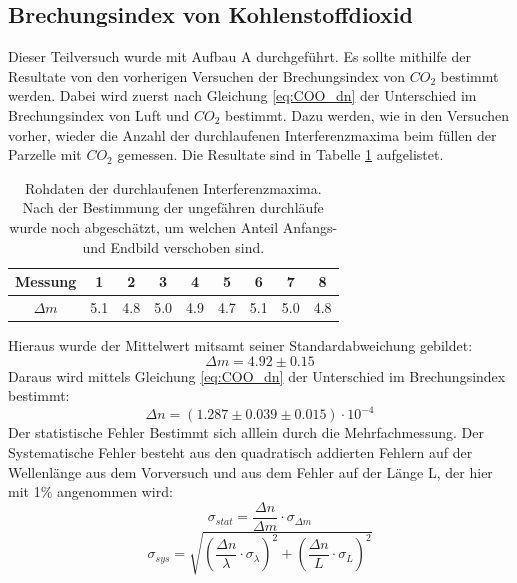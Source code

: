 \documentclass[12pt,a4paper]{article}
\begin{document}
\subsection{Brechungsindex von Kohlenstoffdioxid}
Dieser Teilversuch wurde mit Aufbau A durchgeführt.
Es sollte mithilfe der Resultate von den vorherigen Versuchen der Brechungsindex von $CO_2$ bestimmt werden. Dabei wird zuerst nach Gleichung \ref{eq:COO_dn} der Unterschied im Brechungsindex von Luft und $CO_2$ bestimmt. Dazu werden, wie in den Versuchen vorher, wieder die Anzahl der durchlaufenen Interferenzmaxima beim füllen der Parzelle mit $CO_2$ gemessen. Die Resultate sind in Tabelle \ref{tab:COO_Rohdaten} aufgelistet.

\begin{table}
\center
\begin{tabular}{|c|c|c|c|c|c|c|c|c|}
\hline
Messung & 1 & 2 & 3 & 4 & 5 & 6 & 7 & 8\\
\hline
$\Delta m$ & 5.1 & 4.8 & 5.0 & 4.9 & 4.7 & 5.1 & 5.0 & 4.8\\
\hline
\end{tabular}
\caption{Rohdaten der durchlaufenen Interferenzmaxima. Nach der Bestimmung der ungefähren durchläufe wurde noch abgeschätzt, um welchen Anteil Anfangs- und Endbild verschoben sind.}
\label{tab:COO_Rohdaten}
\end{table}

Hieraus wurde der Mittelwert mitsamt seiner Standardabweichung gebildet:
\begin{equation}
\Delta m = 4.92 \pm 0.15
\end{equation}
Daraus wird mittels Gleichung \ref{eq:COO_dn} der Unterschied im Brechungsindex bestimmt:
\begin{equation}
\Delta n = (1.287 \pm 0.039 \pm 0.015)\cdot 10^{-4}
\end{equation}
Der statistische Fehler Bestimmt sich alllein durch die Mehrfachmessung.
Der Systematische Fehler besteht aus den quadratisch addierten Fehlern auf der Wellenlänge aus dem Vorversuch und aus dem Fehler auf der Länge L, der hier mit 1\% angenommen wird:
\begin{equation}
\sigma_{stat} = \dfrac{\Delta n}{\Delta m} \cdot \sigma_{\Delta m}
\end{equation}
\begin{equation}
\sigma_{sys} = \sqrt{\left(\dfrac{\Delta n}{\lambda} \cdot \sigma_{\lambda}\right)^2 + \left(\dfrac{\Delta n}{L} \cdot \sigma_{L}\right)^2}
\end{equation}
\end{document}
